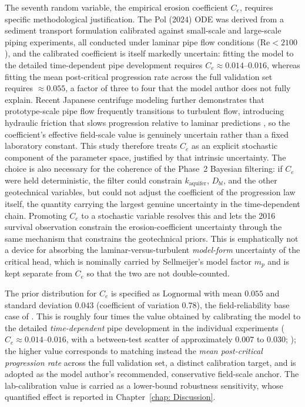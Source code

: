 The seventh random variable, the empirical erosion coefficient $C_e$, requires specific methodological justification. The Pol (2024) ODE was derived from a sediment transport formulation calibrated against small-scale and large-scale piping experiments, all conducted under laminar pipe flow conditions ($\mathrm{Re} < 2100$), and the calibrated coefficient is itself markedly uncertain: fitting the model to the detailed time-dependent pipe development requires $C_e \approx 0.014$--$0.016$, whereas fitting the mean post-critical progression rate across the full validation set requires $\approx 0.055$, a factor of three to four that the model author does not fully explain. Recent Japanese centrifuge modeling further demonstrates that prototype-scale pipe flow frequently transitions to turbulent flow, introducing hydraulic friction that slows progression relative to laminar predictions \parencite{Okamura2022, Okamura2025_prediction}, so the coefficient's effective field-scale value is genuinely uncertain rather than a fixed laboratory constant. This study therefore treats $C_e$ as an explicit stochastic component of the parameter space, justified by that intrinsic uncertainty. The choice is also necessary for the coherence of the Phase~2 Bayesian filtering: if $C_e$ were held deterministic, the filter could constrain $k_\mathrm{aquifer}$, $D_{bl}$, and the other geotechnical variables, but could not adjust the coefficient of the progression law itself, the quantity carrying the largest genuine uncertainty in the time-dependent chain. Promoting $C_e$ to a stochastic variable resolves this and lets the 2016 survival observation constrain the erosion-coefficient uncertainty through the same mechanism that constrains the geotechnical priors. This is emphatically not a device for absorbing the laminar-versus-turbulent \emph{model-form} uncertainty of the critical head, which is nominally carried by Sellmeijer's model factor $m_p$ \parencite{pol_sie_2024} and is kept separate from $C_e$ so that the two are not double-counted.

The prior distribution for $C_e$ is specified as $\mathrm{Lognormal}$ with mean $0.055$ and standard deviation $0.043$ (coefficient of variation $0.78$), the field-reliability base case of \textcite{pol_sie_2024}. This is roughly four times the value obtained by calibrating the model to the detailed \emph{time-dependent} pipe development in the individual experiments ($C_e \approx 0.014$--$0.016$, with a between-test scatter of approximately $0.007$ to $0.030$; \cite{pol_compgeo_2024}); the higher value corresponds to matching instead the \emph{mean post-critical progression rate} across the full validation set, a distinct calibration target, and is adopted as the model author's recommended, conservative field-scale anchor. The lab-calibration value is carried as a lower-bound robustness sensitivity, whose quantified effect is reported in Chapter~\ref{chap: Discussion}.

